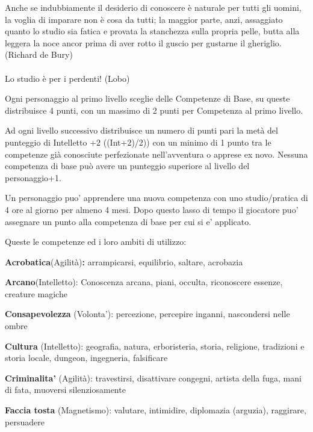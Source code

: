 \documentclass[a4paper,11pt,twoside,openany]{book}
\begin{document}
\label{competenze-di-base}

\begin{tcolorbox}[enhanced,arc=5pt,boxrule=0.3pt]{
		Anche se indubbiamente il desiderio di conoscere è naturale per tutti gli uomini, la voglia di imparare non è cosa da tutti; la maggior parte, anzi, assaggiato quanto lo studio sia fatica e provata la stanchezza sulla propria pelle, butta alla leggera la noce ancor prima di aver rotto il guscio per gustarne il gheriglio. (Richard de Bury)\\\\
		Lo studio è per i perdenti! (Lobo)
	}\end{tcolorbox}\medskip

Ogni personaggio al primo livello sceglie delle Competenze di Base, su queste distribuisce 4 punti, con un massimo di 2 punti per Competenza al primo livello.

Ad ogni livello successivo distribuisce un numero di punti pari la metà del punteggio di Intelletto +2 ((Int+2)/2)) con un minimo di 1 punto tra le competenze già conosciute perfezionate nell'avventura o apprese ex novo. Nessuna competenza di base può avere un  punteggio superiore al livello del personaggio+1.

Un personaggio puo' apprendere una nuova competenza con uno studio/pratica di 4 ore al giorno per almeno 4 mesi. Dopo questo lasso di tempo il giocatore puo' assegnare un punto alla competenza di base per cui si e' applicato.

\bigskip

Queste le competenze ed i loro ambiti di utilizzo:

\textbf{Acrobatica}(Agilità)\textbf{:} arrampicarsi, equilibrio, saltare, acrobazia

\textbf{Arcano}(Intelletto): Conoscenza arcana, piani, occulta, riconoscere essenze, creature magiche

\textbf{Consapevolezza} (Volonta'): percezione, percepire inganni, nascondersi nelle ombre

\textbf{Cultura} (Intelletto): geografia, natura, erboristeria, storia, religione, tradizioni e storia locale, dungeon, ingegneria, falsificare

\textbf{Criminalita'} (Agilità): travestirsi, disattivare congegni, artista della fuga, mani di fata, muoversi silenziosamente

\textbf{Faccia tosta} (Magnetismo): valutare, intimidire, diplomazia (arguzia), raggirare, persuadere
\end{document}
